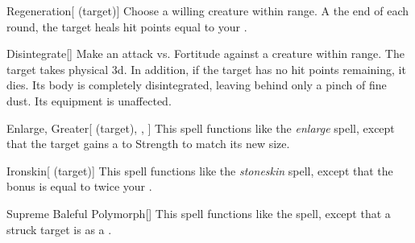 \lowercase{\hypertarget{spell:Regeneration}{}}\label{spell:Regeneration}
\begin{attuneability}[\nth{4}]{\hypertarget{spell:Regeneration}{Regeneration}}[ (target)]
Choose a willing creature within \rngclose range.
A the end of each round, the target heals hit points equal to your .
\end{attuneability}
\vspace{0.25em}



\lowercase{\hypertarget{spell:Disintegrate}{}}\label{spell:Disintegrate}
\begin{freeability}[\nth{5}]{\hypertarget{spell:Disintegrate}{Disintegrate}}[]
Make an attack vs. Fortitude against a creature within \rngmed range.
\hit The target takes physical  \plus3d.
In addition, if the target has no hit points remaining, it dies.
Its body is completely disintegrated, leaving behind only a pinch of fine dust.
Its equipment is unaffected.
\end{freeability}
\vspace{0.25em}



\lowercase{\hypertarget{spell:Enlarge, Greater}{}}\label{spell:Enlarge, Greater}
\begin{attuneability}[\nth{5}]{\hypertarget{spell:Enlarge, Greater}{Enlarge, Greater}}[ (target), , ]
This spell functions like the \textit{enlarge} spell, except that the target gains a   to Strength to match its new size.
\end{attuneability}
\vspace{0.25em}



\lowercase{\hypertarget{spell:Ironskin}{}}\label{spell:Ironskin}
\begin{attuneability}[\nth{6}]{\hypertarget{spell:Ironskin}{Ironskin}}[ (target)]
This spell functions like the \textit{stoneskin} spell, except that the bonus is equal to twice your .
\end{attuneability}
\vspace{0.25em}



\lowercase{\hypertarget{spell:Supreme Baleful Polymorph}{}}\label{spell:Supreme Baleful Polymorph}
\begin{freeability}[\nth{6}]{\hypertarget{spell:Supreme Baleful Polymorph}{Supreme Baleful Polymorph}}[]
This spell functions like the  spell, except that a struck target is  as a .
\end{freeability}
\vspace{0.25em}



